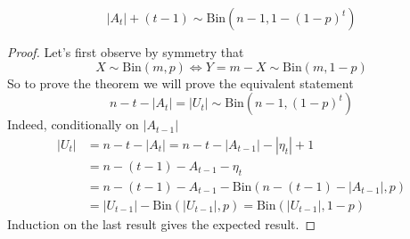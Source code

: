 \begin{theorem}\label{th:Atlaw}
	\begin{equation}
		|A_t| + (t-1) \sim \text{Bin}(n-1, 1 - (1-p)^t)
	\end{equation}
\end{theorem}
\begin{proof}
	Let's first observe by symmetry that 
	\begin{equation}
		X \sim \text{Bin}(m, p) \iff Y = m-X \sim \text{Bin}(m, 1-p)
	\end{equation}
	So to prove the theorem we will prove the equivalent statement
	\begin{equation}
		n-t-|A_t| = |U_t| \sim \text{Bin}(n-1, (1-p)^t)
	\end{equation}
	Indeed, conditionally on $|A_{t-1}|$
	\begin{align}
		|U_t| &= n - t - |A_t| = n - t - |A_{t-1}| - |\eta_t| + 1 \\
		      &= n - (t-1) - A_{t-1} -\eta_t \\
		      &= n - (t-1) - A_{t-1} - \text{Bin}(n-(t-1)-|A_{t-1}|, p)\\
		      &=|U_{t-1}| - \text{Bin}(|U_{t-1}|, p) = \text{Bin}(|U_{t-1}|, 1-p)
	\end{align}
	Induction on the last result gives the expected result.
\end{proof}

